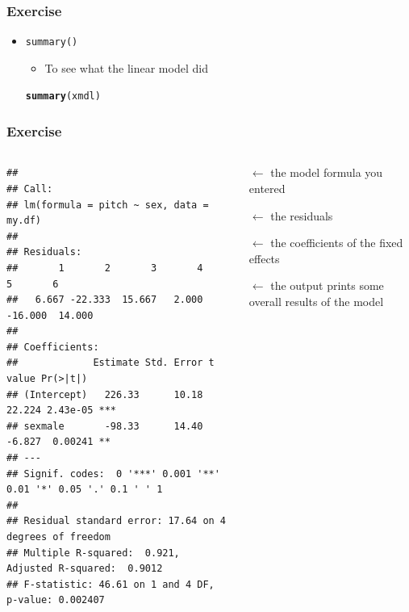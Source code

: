 \documentclass[10p]{beamer}\usepackage[]{graphicx}\usepackage[]{color}
\makeatletter
\newcommand{\hlstd}[1]{\textcolor[rgb]{0.345,0.345,0.345}{#1}}%
\newcommand{\hlkwd}[1]{\textcolor[rgb]{0.737,0.353,0.396}{\textbf{#1}}}%
\newenvironment{kframe}{%
 \def\at@end@of@kframe{}%
 \ifinner\ifhmode%
  \def\at@end@of@kframe{\end{minipage}}%
  \begin{minipage}{\columnwidth}%
 \fi\fi%
 \def\FrameCommand##1{\hskip\@totalleftmargin \hskip-\fboxsep
 \colorbox{shadecolor}{##1}\hskip-\fboxsep
     \hskip-\linewidth \hskip-\@totalleftmargin \hskip\columnwidth}%
 \MakeFramed {\advance\hsize-\width
   \@totalleftmargin\z@ \linewidth\hsize
   \@setminipage}}%
 {\par\unskip\endMakeFramed%
 \at@end@of@kframe}
\newenvironment{knitrout}{}{} %
\makeatother
\begin{document}
\begin{frame}[fragile]
\frametitle{Exercise}
\begin{itemize}

\item \texttt{summary()}
	\begin{itemize}
	\item To see what the linear model did
	\end{itemize}
\begin{knitrout}
\color{fgcolor}\begin{kframe}
\begin{alltt}
\hlkwd{summary}\hlstd{(xmdl)}
\end{alltt}
\end{kframe}
\end{knitrout}
\end{itemize}
\end{frame}


\begin{frame}[fragile]
\frametitle{Exercise}

\begin{columns}[T]
\begin{column}{.7\textwidth}
\begin{knitrout}\tiny
{}\color{fgcolor}\begin{kframe}
\begin{verbatim}
## 
## Call:
## lm(formula = pitch ~ sex, data = my.df)
## 
## Residuals:
##       1       2       3       4       5       6 
##   6.667 -22.333  15.667   2.000 -16.000  14.000 
## 
## Coefficients:
##             Estimate Std. Error t value Pr(>|t|)    
## (Intercept)   226.33      10.18  22.224 2.43e-05 ***
## sexmale       -98.33      14.40  -6.827  0.00241 ** 
## ---
## Signif. codes:  0 '***' 0.001 '**' 0.01 '*' 0.05 '.' 0.1 ' ' 1
## 
## Residual standard error: 17.64 on 4 degrees of freedom
## Multiple R-squared:  0.921,	Adjusted R-squared:  0.9012 
## F-statistic: 46.61 on 1 and 4 DF,  p-value: 0.002407
\end{verbatim}
\end{kframe}
\end{knitrout}
\end{column}
\begin{column}{.35\textwidth}
\vspace{15pt}
$\leftarrow$ the model formula you entered 

$\leftarrow$ the residuals

\vspace{14pt}
$\leftarrow$ the coefficients of the fixed effects

\vspace{18pt}
$\leftarrow$ the output prints some overall results of the model
\end{column}
\end{columns}
\end{frame}
\end{document}
